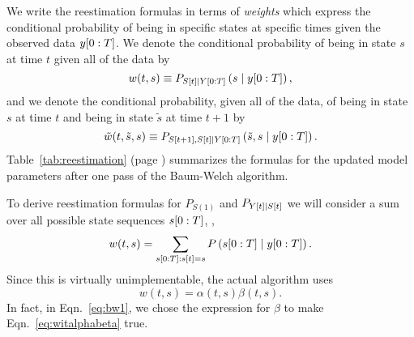 We write the reestimation formulas in terms of \emph{weights} which
express the conditional probability of being in specific states at
specific times given the observed data $y[0:T]$.  We denote the
conditional probability of being in state $s$ at time $t$ given all of
the data by
\begin{equation}
  \label{eq:wit}
  w(t,s) \equiv P_{{S}{[t]}\mid Y[0:T]} \left(s\mid y[0:T]
  \right),
\end{equation}
and we denote the conditional probability, given all of the data, of
being in state $s$ at time $t$ and being in state ${\tilde s}$ at time
$t+1$ by
\begin{equation}
  \label{eq:wijt}
  {\tilde w}(t,{\tilde s},s) \equiv P_{{S}{[t+1]},{S}{[t]}\mid Y[0:T]}
  \left({\tilde s},s\mid y[0:T] \right).
\end{equation}
Table~\ref{tab:reestimation} (page \pageref{tab:reestimation})
summarizes the formulas for the updated model parameters after one
pass of the Baum-Welch algorithm.

To derive reestimation formulas for $P_{S(1)}$ and
$P_{{Y}{[t]}\mid {S}{[t]}}$ we will consider a sum over all possible
state sequences $s[0:T]$, \ie,
\begin{equation}
  \label{eq:witFFE}
  w(t,s) = \sum_{s[0:T]:{s}{[t]}=s}
  P \left(s[0:T]\mid y[0:T]
  \right).
\end{equation}
Since this is virtually unimplementable, the actual algorithm uses
\begin{equation}
  \label{eq:witalphabeta}
  w(t,s) = \alpha(t,s) \beta(t,s).
\end{equation}
In fact, in Eqn.~\eqref{eq:bw1}, we chose the expression for $\beta$
to make Eqn.~\eqref{eq:witalphabeta} true.

